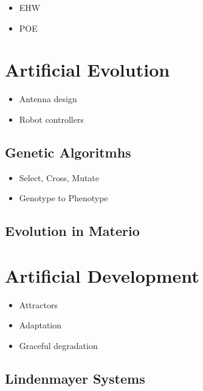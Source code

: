 \TODO

\begin{itemize}
    \item EHW
    \item POE
\end{itemize}

\section{Artificial Evolution}

\TODO

\begin{itemize}
    \item Antenna design
    \item Robot controllers
\end{itemize}

\subsection{Genetic Algoritmhs}

\TODO

\begin{itemize}
    \item Select, Cross, Mutate
    \item Genotype to Phenotype
\end{itemize}

\subsection{Evolution in Materio}

\TODO

\section{Artificial Development}

\TODO

\begin{itemize}
    \item Attractors
    \item Adaptation
    \item Graceful degradation
\end{itemize}

\subsection{Lindenmayer Systems}

\TODO

